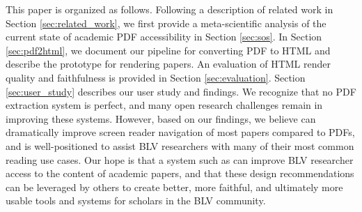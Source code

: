 This paper is organized as follows. Following a description of related work in Section \ref{sec:related_work}, we first provide a meta-scientific analysis of the current state of academic PDF accessibility in Section \ref{sec:sos}. In Section \ref{sec:pdf2html}, we document our pipeline for converting PDF to HTML and describe the \scially prototype for rendering papers. An evaluation of HTML render quality and faithfulness is provided in Section \ref{sec:evaluation}. Section \ref{sec:user_study} describes our user study and findings. 
We recognize that no PDF extraction system is perfect, and many open research challenges remain in improving these systems. However, based on our findings, we believe \scially can dramatically improve screen reader navigation of most papers compared to PDFs, and is well-positioned to assist BLV researchers with many of their most common reading use cases. Our hope is that a system such as \scially can improve BLV researcher access to the content of academic papers, and that these design recommendations can be leveraged by others to create better, more faithful, and ultimately more usable tools and systems for scholars in the BLV community.
